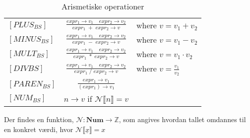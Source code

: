 \bgroup
\def\arraystretch{3}
\begin{table}[H]
\centering
\begin{tabular}{l c l}
    
    $[PLUS_{BS}]$ &$\frac{expr_1 \rightarrow v_1 \quad expr_2 \rightarrow v_2}{expr_1\;+\;expr_2 \rightarrow v}$ & where $v = v_1 + v_2$ \\
    
    $[MINUS_{BS}]$ &$\frac{expr_1 \rightarrow v_1 \quad expr_2 \rightarrow v_2}{expr_1\;-\;expr_2 \rightarrow v}$ & where $v = v_1 - v_2$ \\
    
    $[MULT_{BS}]$ &$\frac{expr_1 \rightarrow v_1 \quad expr_2 \rightarrow v_2}{expr_1\;*\;expr_2 \rightarrow v}$ & where $v = v_1 \cdot v_2$ \\
    
    $[DIV{BS}]$ &$\frac{expr_1 \rightarrow v_1 \quad expr_2 \rightarrow v_2}{expr_1\;/\;expr_2 \rightarrow v}$ & where $v = \frac{v_1}{v_2}$ \\
    
    
    $[PAREN_{BS}]$ &$\frac{expr_1 \rightarrow v_1}{(expr_1) \rightarrow v_1}$ & \\
    
    $[NUM_{BS}]$ &$n \rightarrow v$ if $\mathcal{N}\llbracket n\rrbracket = v$ & \\
    
\end{tabular}
\caption{Arismetiske operationer}
\label{tab:arithmetic}
\end{table}
\egroup

Der findes en funktion, $\mathcal{N} : \textbf{Num} \rightarrow \mathbb{Z}$, som angives hvordan tallet omdannes til en konkret værdi, hvor $\mathcal{N}\llbracket \underline{x}\rrbracket = x$

